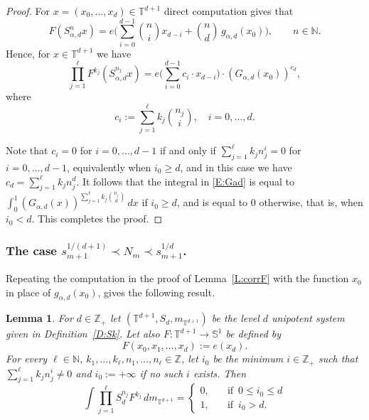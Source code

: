 \documentclass[11pt]{amsart}
\newtheorem{lemma}{Lemma}[section]
\theoremstyle{definition}
\newcommand{\N}{{\mathbb N}}
\renewcommand{\S}{\mathbb{S}}
\newcommand{\T}{{\mathbb T}}
\newcommand{\Z}{{\mathbb Z}}
\begin{document}
\begin{proof}
For $x=(x_0,\ldots, x_d)\in \T^{d+1}$ direct computation gives that
$$
F(S_{\alpha,d}^nx)= e\Big(\sum_{i=0}^{d-1}\binom{n}{i} x_{d-i}+ \binom{n}{d} \, g_{\alpha,d}( x_{0})\Big), \qquad n\in\N.
$$
Hence, for $x\in \T^{d+1}$ we have
$$
\prod_{j=1}^\ell F^{k_j}(S_{\alpha,d}^{n_j}x)=e\Big(\sum_{i=0}^{d-1} c_i \cdot x_{d-i}\Big)\cdot
(G_{\alpha,d}(x_0))^{c_d},
$$
where
$$
c_i:=\sum_{j=1}^\ell k_j \binom{n_j}{i}, \quad i=0,\ldots, d.
$$

Note that $c_i=0$ for $i=0,\ldots, d-1$ if and only if
$\sum_{j=1}^\ell k_jn_j^i=0$ for $i=0,\ldots, d-1$,  equivalently when $i_0\geq d$, and in this case we have $c_d=\sum_{j=1}^\ell k_jn_j^d$.
It follows that  the integral in \eqref{E:Gad}  is
equal to  	$\int_0^1 (G_{\alpha,d}(x))^{\sum_{j=1}^\ell k_j\binom{n_j}{d}}\,dx$   if  $i_0\geq d$,
and is equal to  $0$ otherwise, that is, when $i_0<d$.
This completes the proof.
\end{proof}

 \subsubsection{The case  $s_{m+1}^{1/(d+1)}\prec N_m\prec s_{m+1}^{1/d}$.}
 Repeating the computation in the proof of Lemma~\ref{L:corrF} with the function $x_0$ in place  of $g_{\alpha,d}(x_0)$, gives the following result.
 \begin{lemma}\label{L:corrFint}
 	For $d\in \Z_+$ let
 $(\T^{d+1}, S_d,m_{\T^{d+1}})$ be the level $d$ unipotent system given in Definition~\ref{D:Sk}. Let also
 	 $F\colon \T^{d+1}\to \S^1$ be defined by
 	$$
 	F(x_0,x_1,\ldots, x_d):=e(x_d).
 	$$
  	For every $\ell\in\N$, $k_1,\ldots, k_\ell, n_1,\ldots, n_\ell \in \Z$,
 	let  $i_0$ be the minimum $i\in \Z_+$
 	such that $\sum_{j=1}^\ell k_j n_j^i\neq  0$ and $i_0:=+\infty$ if no such   $i$ exists.
Then 	
 	$$
 	\int \prod_{j=1}^\ell S_d^{n_j}F^{k_j}\, dm_{\T^{d+1}}=
 	\begin{cases}
 		0, & \quad \text{if }\,  0\leq i_0\leq d\\
 		1, & \quad \text{if } \, i_0>d.
 	\end{cases}
 	$$
 \end{lemma}
\end{document}
